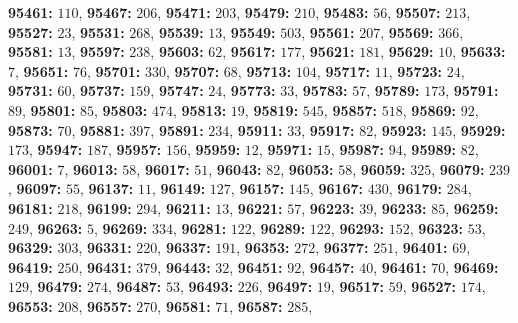 \textsf{\bfseries 95461:} $110$, \textsf{\bfseries 95467:} $206$, \textsf{\bfseries 95471:} $203$, \textsf{\bfseries 95479:} $210$, \textsf{\bfseries 95483:} $56$, \textsf{\bfseries 95507:} $213$, \textsf{\bfseries 95527:} $23$, \textsf{\bfseries 95531:} $268$, \textsf{\bfseries 95539:} $13$, \textsf{\bfseries 95549:} $503$, \textsf{\bfseries 95561:} $207$, \textsf{\bfseries 95569:} $366$, \textsf{\bfseries 95581:} $13$, \textsf{\bfseries 95597:} $238$, \textsf{\bfseries 95603:} $62$, \textsf{\bfseries 95617:} $177$, \textsf{\bfseries 95621:} $181$, \textsf{\bfseries 95629:} $10$, \textsf{\bfseries 95633:} $7$, \textsf{\bfseries 95651:} $76$, \textsf{\bfseries 95701:} $330$, \textsf{\bfseries 95707:} $68$, \textsf{\bfseries 95713:} $104$, \textsf{\bfseries 95717:} $11$, \textsf{\bfseries 95723:} $24$, \textsf{\bfseries 95731:} $60$, \textsf{\bfseries 95737:} $159$, \textsf{\bfseries 95747:} $24$, \textsf{\bfseries 95773:} $33$, \textsf{\bfseries 95783:} $57$, \textsf{\bfseries 95789:} $173$, \textsf{\bfseries 95791:} $89$, \textsf{\bfseries 95801:} $85$, \textsf{\bfseries 95803:} $474$, \textsf{\bfseries 95813:} $19$, \textsf{\bfseries 95819:} $545$, \textsf{\bfseries 95857:} $518$, \textsf{\bfseries 95869:} $92$, \textsf{\bfseries 95873:} $70$, \textsf{\bfseries 95881:} $397$, \textsf{\bfseries 95891:} $234$, \textsf{\bfseries 95911:} $33$, \textsf{\bfseries 95917:} $82$, \textsf{\bfseries 95923:} $145$, \textsf{\bfseries 95929:} $173$, \textsf{\bfseries 95947:} $187$, \textsf{\bfseries 95957:} $156$, \textsf{\bfseries 95959:} $12$, \textsf{\bfseries 95971:} $15$, \textsf{\bfseries 95987:} $94$, \textsf{\bfseries 95989:} $82$, \textsf{\bfseries 96001:} $7$, \textsf{\bfseries 96013:} $58$, \textsf{\bfseries 96017:} $51$, \textsf{\bfseries 96043:} $82$, \textsf{\bfseries 96053:} $58$, \textsf{\bfseries 96059:} $325$, \textsf{\bfseries 96079:} $239$, \textsf{\bfseries 96097:} $55$, \textsf{\bfseries 96137:} $11$, \textsf{\bfseries 96149:} $127$, \textsf{\bfseries 96157:} $145$, \textsf{\bfseries 96167:} $430$, \textsf{\bfseries 96179:} $284$, \textsf{\bfseries 96181:} $218$, \textsf{\bfseries 96199:} $294$, \textsf{\bfseries 96211:} $13$, \textsf{\bfseries 96221:} $57$, \textsf{\bfseries 96223:} $39$, \textsf{\bfseries 96233:} $85$, \textsf{\bfseries 96259:} $249$, \textsf{\bfseries 96263:} $5$, \textsf{\bfseries 96269:} $334$, \textsf{\bfseries 96281:} $122$, \textsf{\bfseries 96289:} $122$, \textsf{\bfseries 96293:} $152$, \textsf{\bfseries 96323:} $53$, \textsf{\bfseries 96329:} $303$, \textsf{\bfseries 96331:} $220$, \textsf{\bfseries 96337:} $191$, \textsf{\bfseries 96353:} $272$, \textsf{\bfseries 96377:} $251$, \textsf{\bfseries 96401:} $69$, \textsf{\bfseries 96419:} $250$, \textsf{\bfseries 96431:} $379$, \textsf{\bfseries 96443:} $32$, \textsf{\bfseries 96451:} $92$, \textsf{\bfseries 96457:} $40$, \textsf{\bfseries 96461:} $70$, \textsf{\bfseries 96469:} $129$, \textsf{\bfseries 96479:} $274$, \textsf{\bfseries 96487:} $53$, \textsf{\bfseries 96493:} $226$, \textsf{\bfseries 96497:} $19$, \textsf{\bfseries 96517:} $59$, \textsf{\bfseries 96527:} $174$, \textsf{\bfseries 96553:} $208$, \textsf{\bfseries 96557:} $270$, \textsf{\bfseries 96581:} $71$, \textsf{\bfseries 96587:} $285$, 
